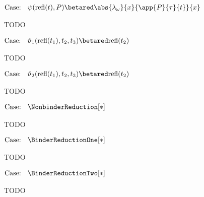 $\text{Case: }\begin{array}{c} \psi(\text{refl}(t),P) \betared \abs{\lambda_\omega}{x}{\app{P}{\tau}{t}}{x} \end{array}$
\begin{proofcase}
    TODO
\end{proofcase}

$\text{Case: }\begin{array}{c} \vartheta_1(\text{refl}(t_1), t_2, t_3) \betared \text{refl}(t_2) \end{array}$
\begin{proofcase}
    TODO
\end{proofcase}

$\text{Case: }\begin{array}{c} \vartheta_2(\text{refl}(t_1), t_2, t_3) \betared \text{refl}(t_2) \end{array}$
\begin{proofcase}
    TODO
\end{proofcase}

$\text{Case: }\begin{array}{c} \NonbinderReduction[*] \end{array}$
\begin{proofcase}
    TODO
\end{proofcase}

$\text{Case: }\begin{array}{c} \BinderReductionOne[*] \end{array}$
\begin{proofcase}
    TODO
\end{proofcase}

$\text{Case: }\begin{array}{c} \BinderReductionTwo[*] \end{array}$
\begin{proofcase}
    TODO
\end{proofcase}

